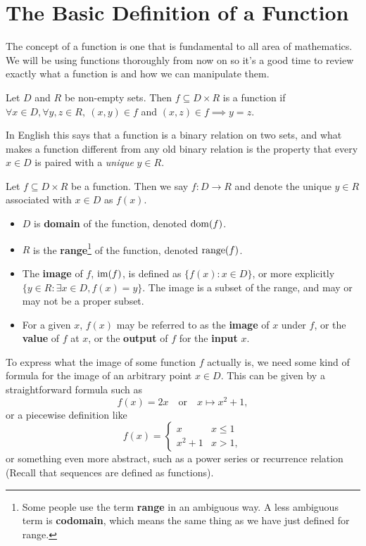 \documentclass[../real_analysis.tex]{subfiles}
\begin{document}
    \section{The Basic Definition of a Function}\label{sec:basic-definition-of-a-function}
        The concept of a function is one that is fundamental to all area of mathematics. We will be using functions thoroughly from now on so it's a good time to review exactly what a function is and how we can manipulate them.
        \begin{definition}
            Let $D$ and $R$ be non-empty sets. Then $f \subseteq D \times R$ is a function if $\forall x \in D, \forall y, z \in R,\ (x, y) \in f$ and $(x, z) \in f \implies y = z.$
        \end{definition}
        In English this says that a function is a binary relation on two sets, and what makes a function different from any old binary relation is the property that every $x \in D$ is paired with a \textit{unique} $y \in R$.
        \begin{definition}
            Let $f \subseteq D \times R$ be a function.
            Then we say $f: D \to R$ and denote the unique $y \in R$ associated with $x \in D$ as $f(x)$.
            \begin{itemize}
                \item $D$ is \textbf{domain} of the function, denoted $\operatorname{dom}(f)$.
                \item $R$ is the \textbf{range}\footnote{Some people use the term \textbf{range} in an ambiguous way. A less ambiguous term is \textbf{codomain}, which means the same thing as we have just defined for range.} of the function, denoted $\operatorname{range}(f)$.
                \item The \textbf{image} of $f$, $\operatorname{im}(f)$, is defined as ${\{f(x):x \in D\}}$, or more explicitly ${\{y \in R : \exists x \in D, f(x)=y\}}$. The image is a subset of the range, and may or may not be a proper subset.
                \item For a given $x$, $f(x)$ may be referred to as the \textbf{image} of $x$ under $f$, or the \textbf{value} of $f$ at $x$, or the \textbf{output} of $f$ for the \textbf{input} $x$.
            \end{itemize}
        \end{definition}
        To express what the image of some function $f$ actually is, we need some kind of formula for the image of an arbitrary point $x \in D$. This can be given by a straightforward formula such as
        \begin{equation}
            f(x) = 2x \quad \text{or}\quad x \mapsto x^2 + 1,
        \end{equation}
        or a piecewise definition like
        \begin{equation}
            f(x) = \begin{cases}
                        x & x \leq 1 \\
                        x^2 + 1 & x > 1,
                    \end{cases}
        \end{equation}
        or something even more abstract, such as a power series or recurrence relation (Recall that sequences are defined as functions).
\end{document}
